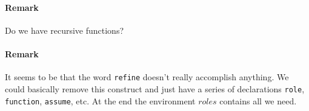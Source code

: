 \documentclass{report}
\begin{document}
\paragraph{Remark} Do we have recursive functions?

\paragraph{Remark} It seems to be that the word \texttt{refine} doesn't really accomplish
anything. We could basically remove this construct and just have a series of declarations
\texttt{role}, \texttt{function}, \texttt{assume}, etc. At the end the environment $roles$
contains all we need.
\end{document}
